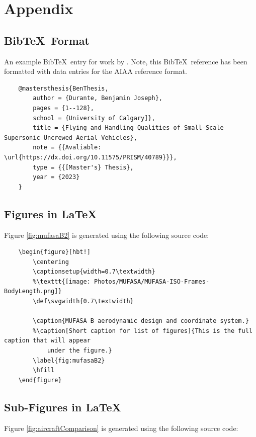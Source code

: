 \section{Appendix}

\subsection{Bib\TeX\ Format} \label{sec:appendixBibTex}
An example Bib\TeX\ entry for work by \citeauthor{BenThesis} \cite{BenThesis}. 
Note, this Bib\TeX\ reference has been formatted with data entries for the AIAA reference format.  

\begin{verbatim}
	@mastersthesis{BenThesis,
		author = {Durante, Benjamin Joseph},
		pages = {1--128},
		school = {University of Calgary]},
		title = {Flying and Handling Qualities of Small-Scale Supersonic Uncrewed Aerial Vehicles},
		note = {{Avaliable: \url{https://dx.doi.org/10.11575/PRISM/40789}}},
		type = {{[Master's} Thesis},
		year = {2023}
	}
\end{verbatim}

\subsection{Figures in \LaTeX} \label{sec:appendixFigureSourceCode}

Figure \ref{fig:mufasaB2} is generated using the following source code:

\begin{verbatim}
	\begin{figure}[hbt!]
		\centering
		\captionsetup{width=0.7\textwidth}
		%\texttt{[image: Photos/MUFASA/MUFASA-ISO-Frames-BodyLength.png]}
		\def\svgwidth{0.7\textwidth}
		
		\caption{MUFASA B aerodynamic design and coordinate system.}
		%\caption[Short caption for list of figures]{This is the full caption that will appear 
			under the figure.}
		\label{fig:mufasaB2}
		\hfill
	\end{figure}
\end{verbatim}

\subsection{Sub-Figures in \LaTeX} \label{sec:appendixSubFigureSourceCode}

Figure \ref{fig:aircraftComparison} is generated using the following source code:

